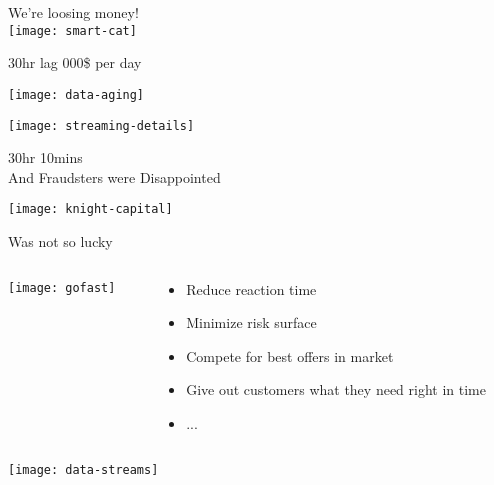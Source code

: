 \documentclass[aspectratio=169, 15pt,usenames,dvipsnames]{beamer}
\begin{document}
\begin{gdsw}
	\centering\Large We're loosing money!\\
	\texttt{[image: smart-cat]} 
	\par\centering
	\pause
	30hr lag  000\$ per day
\end{gdsw}
\begin{gdsw}
\end{gdsw}	
\begin{gdsw}
\end{gdsw}
\begin{gdsw}
	\centering\texttt{[image: data-aging]} 
\end{gdsw}
\begin{gdsw}
	\centering\texttt{[image: streaming-details]} 
	\par\pause\Large
	30hr \rightarrow \Rightarrow 10mins\\
	And Fraudsters were Disappointed
\end{gdsw}
\begin{gdsw}
	\centering\texttt{[image: knight-capital]} 
	\par
	Was not so lucky
\end{gdsw}
\begin{gdsw}		
	\begin{columns}
		\begin{column}{0.4\textwidth}
			\centering\texttt{[image: gofast]} 
		\end{column}
		\begin{column}{0.6\textwidth}
			\large\centering 
			\begin{itemize}
				\item Reduce reaction time
				\item Minimize risk surface
				\item Compete for best offers in market
				\item Give out customers what they need right in time
				\item ...
			\end{itemize}	
		\end{column}
	\end{columns}
\end{gdsw}
\begin{gdsw}
	\centering\texttt{[image: data-streams]}\\
\end{gdsw}
\end{document}
